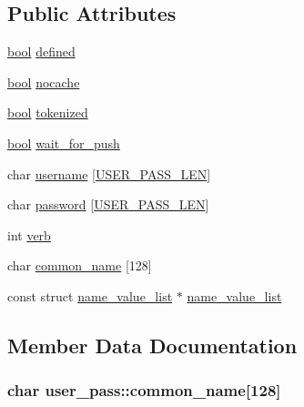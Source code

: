 \subsection*{Public Attributes}
\begin{DoxyCompactItemize}
\item 
\hyperlink{automatic_8c_abb452686968e48b67397da5f97445f5b}{bool} \hyperlink{structuser__pass_ad75eed178093897d95e7f8bc584397e0}{defined}
\item 
\hyperlink{automatic_8c_abb452686968e48b67397da5f97445f5b}{bool} \hyperlink{structuser__pass_ade9477322cbb41a905b75968d99971a8}{nocache}
\item 
\hyperlink{automatic_8c_abb452686968e48b67397da5f97445f5b}{bool} \hyperlink{structuser__pass_afeb7aae9cf8bb87c4f28d4f7aa2186d6}{tokenized}
\item 
\hyperlink{automatic_8c_abb452686968e48b67397da5f97445f5b}{bool} \hyperlink{structuser__pass_a62abbdabb5f55d97ee462fc616ffb6f5}{wait\+\_\+for\+\_\+push}
\item 
char \hyperlink{structuser__pass_afd95ee9ee0c23614ce570b8bca3ad0e9}{username} \mbox{[}\hyperlink{misc_8h_a02c5c7d8062c38c9366b379698583a92}{U\+S\+E\+R\+\_\+\+P\+A\+S\+S\+\_\+\+L\+E\+N}\mbox{]}
\item 
char \hyperlink{structuser__pass_adccfd3c88600d76b99aa88926f3fb131}{password} \mbox{[}\hyperlink{misc_8h_a02c5c7d8062c38c9366b379698583a92}{U\+S\+E\+R\+\_\+\+P\+A\+S\+S\+\_\+\+L\+E\+N}\mbox{]}
\item 
int \hyperlink{structuser__pass_a59e142b4f7004e19c5489dd37c1defa4}{verb}
\item 
char \hyperlink{structuser__pass_a51c867559fe355aa0d1117463d284176}{common\+\_\+name} \mbox{[}128\mbox{]}
\item 
const struct \hyperlink{structname__value__list}{name\+\_\+value\+\_\+list} $\ast$ \hyperlink{structuser__pass_a7f22e07ecf56cde788167b23ab2533ea}{name\+\_\+value\+\_\+list}
\end{DoxyCompactItemize}


\subsection{Member Data Documentation}
\hypertarget{structuser__pass_a51c867559fe355aa0d1117463d284176}{}
\subsubsection[{common\+\_\+name}]{\setlength{\rightskip}{0pt plus 5cm}char user\+\_\+pass\+::common\+\_\+name\mbox{[}128\mbox{]}}\label{structuser__pass_a51c867559fe355aa0d1117463d284176}
\hypertarget{structuser__pass_ad75eed178093897d95e7f8bc584397e0}{}
